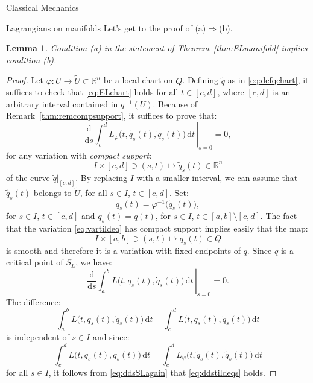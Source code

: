 \documentclass[oneside,a4paper,11pt]{amsbook}
\newcommand{\R}{\mathds R}
\newcommand{\dd}{\mathrm d}
\theoremstyle{remark}\newtheorem{exercise}{Exercise}[chapter]
\theoremstyle{plain}\newtheorem{teo}{Theorem}[section]
\theoremstyle{plain}\newtheorem{lem}[teo]{Lemma}
\theoremstyle{plain}\newtheorem{prop}[teo]{Proposition}
\theoremstyle{plain}\newtheorem{cor}[teo]{Corollary}
\theoremstyle{definition}\newtheorem{defin}[teo]{Definition}
\theoremstyle{remark}\newtheorem{rem}[teo]{Remark}
\theoremstyle{definition}\newtheorem{notation}[teo]{Notation}
\theoremstyle{definition}\newtheorem{convention}[teo]{Convention}
\theoremstyle{definition}\newtheorem{example}[teo]{Example}
\numberwithin{section}{chapter}
\numberwithin{equation}{section}
\begin{document}
\begin{chapter}{Classical Mechanics}
\begin{section}{Lagrangians on manifolds}
Let's get to the proof of (a)$\Rightarrow$(b).
\begin{lem}\label{thm:ELmanifoldab}
Condition (a) in the statement of Theorem~\ref{thm:ELmanifold} implies condition (b).
\end{lem}
\begin{proof}
Let $\varphi:U\to\widetilde U\subset\R^n$ be a local chart on $Q$. Defining $\tilde q$ as in \eqref{eq:defqchart},
it suffices to check that \eqref{eq:ELchart} holds for all $t\in[c,d]$, where $[c,d]$ is an arbitrary interval contained in
$q^{-1}(U)$. Because of Remark~\ref{thm:remcompsupport}, it suffices to prove that:
\begin{equation}\label{eq:ddstildeqs}
\left.\frac{\dd}{\dd s}\int_c^dL_\varphi\big(t,\tilde q_s(t),\dot{\tilde q}_s(t)\big)\,\dd t\,\right\vert_{s=0}=0,
\end{equation}
for any variation with {\em compact support}:
\begin{equation}\label{eq:vartildeq}
I\times[c,d]\ni(s,t)\longmapsto\tilde q_s(t)\in\R^n
\end{equation}
of the curve $\tilde q\vert_{[c,d]}$. By replacing $I$ with a smaller interval, we can assume that $\tilde q_s(t)$
belongs to $\widetilde U$, for all $s\in I$, $t\in[c,d]$. Set:
\[q_s(t)=\varphi^{-1}\big(\tilde q_s(t)\big),\]
for $s\in I$, $t\in[c,d]$ and $q_s(t)=q(t)$, for $s\in I$, $t\in[a,b]\setminus[c,d]$. The fact that
the variation \eqref{eq:vartildeq} has compact support implies easily that the map:
\[I\times[a,b]\ni(s,t)\longmapsto q_s(t)\in Q\]
is smooth and therefore it is a variation with fixed endpoints of $q$. Since $q$ is a critical point of $S_L$,
we have:
\begin{equation}\label{eq:ddsSLagain}
\left.\frac{\dd}{\dd s}\int_a^bL\big(t,q_s(t),\dot q_s(t)\big)\,\dd t\,\right\vert_{s=0}=0.
\end{equation}
The difference:
\[\int_a^bL\big(t,q_s(t),\dot q_s(t)\big)\,\dd t-\int_c^dL\big(t,q_s(t),\dot q_s(t)\big)\,\dd t\]
is independent of $s\in I$ and since:
\[\int_c^dL\big(t,q_s(t),\dot q_s(t)\big)\,\dd t=\int_c^dL_\varphi\big(t,\tilde q_s(t),\dot{\tilde q}_s(t)\big)\,\dd t\]
for all $s\in I$, it follows from \eqref{eq:ddsSLagain} that \eqref{eq:ddstildeqs} holds.
\end{proof}


\end{section}
\end{chapter}
\end{document}
